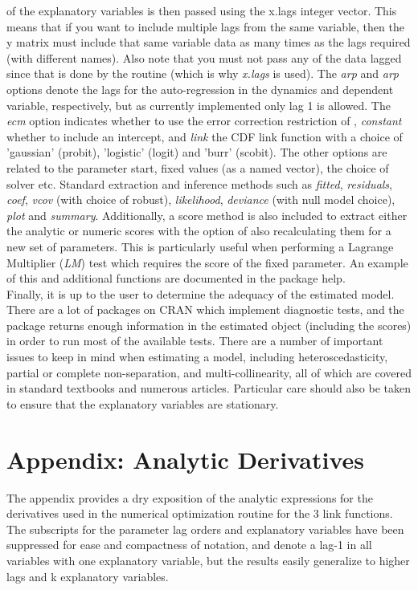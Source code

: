 of the explanatory variables is then passed using the x.lags integer vector. This means that if you want to include multiple lags from the same
variable, then the y matrix must include that same variable data as many times as the lags required (with different names). Also note that you must
not pass any of the data lagged since that is done by the routine (which is why \emph{x.lags} is used). The \emph{arp} and \emph{arp} options denote
the lags for the auto-regression in the dynamics and dependent variable, respectively, but as currently implemented only lag 1 is allowed. The \emph{ecm}
option indicates whether to use the error correction restriction of \cite{Nyberg2011}, \emph{constant} whether to include an intercept, and \emph{link}
the CDF link function with a choice of 'gaussian' (probit), 'logistic' (logit) and 'burr' (scobit). The other options are related to the parameter start,
fixed values (as a named vector), the choice of solver etc. Standard extraction and inference methods such as \emph{fitted}, \emph{residuals},
\emph{coef}, \emph{vcov} (with choice of robust), \emph{likelihood}, \emph{deviance} (with null model choice), \emph{plot} and \emph{summary}. Additionally,
a score method is also included to extract either the analytic or numeric scores with the option of also recalculating them for a new set of parameters.
This is particularly useful when performing a Lagrange Multiplier (\emph{LM}) test which requires the score of the fixed parameter. An example of this and 
additional functions are documented in the package help.\\
Finally, it is up to the user to determine the adequacy of the estimated model. There are a lot of packages on CRAN which implement diagnostic tests, and
the \verb@dbm@ package returns enough information in the estimated object (including the scores) in order to run most of the available tests. There are a
number of important issues to keep in mind when estimating a model, including heteroscedasticity, partial or complete non-separation, and
multi-collinearity, all of which are covered in standard textbooks and numerous articles. Particular care should also be taken to ensure that
the explanatory variables are stationary.
\section{Appendix: Analytic Derivatives}\label{sec:Appendix}
The appendix provides a dry exposition of the analytic expressions for the derivatives used in the numerical
optimization routine for the 3 link functions. The subscripts for the parameter lag orders and explanatory
variables have been suppressed for ease and compactness of notation, and denote a lag-1 in all variables with
one explanatory variable, but the results easily generalize to higher lags and k explanatory variables.
